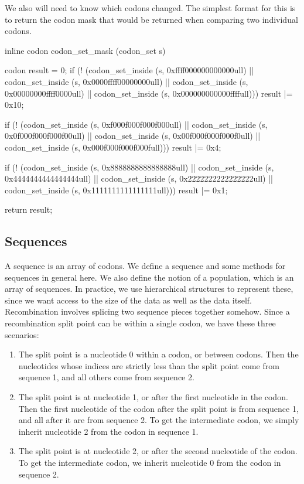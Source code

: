 \documentclass{article}
\begin{document}
      We also will need to know which codons changed. The simplest format for
      this is to return the codon mask that would be returned when comparing two
      individual codons.

\begin{ccode}
inline codon codon_set_mask (codon_set s) {
  codon result = 0;
  if (! (codon_set_inside (s, 0xffff000000000000ull) ||
         codon_set_inside (s, 0x0000ffff00000000ull) ||
         codon_set_inside (s, 0x00000000ffff0000ull) ||
         codon_set_inside (s, 0x000000000000ffffull)))
    result |= 0x10;

  if (! (codon_set_inside (s, 0xf000f000f000f000ull) ||
         codon_set_inside (s, 0x0f000f000f000f00ull) ||
         codon_set_inside (s, 0x00f000f000f000f0ull) ||
         codon_set_inside (s, 0x000f000f000f000full)))
    result |= 0x4;

  if (! (codon_set_inside (s, 0x8888888888888888ull) ||
         codon_set_inside (s, 0x4444444444444444ull) ||
         codon_set_inside (s, 0x2222222222222222ull) ||
         codon_set_inside (s, 0x1111111111111111ull)))
    result |= 0x1;

  return result;
}
\end{ccode}

    \subsection{Sequences}
      \label{sec:sequences}
      
      A sequence is an array of codons. We define a sequence and some methods
      for sequences in general here. We also define the notion of a population,
      which is an array of sequences. In practice, we use hierarchical
      structures to represent these, since we want access to the size of the
      data as well as the data itself. Recombination involves splicing two
      sequence pieces together somehow. Since a recombination split point can be
      within a single codon, we have these three scenarios:

      \begin{enumerate}
	\item The split point is a nucleotide 0 within a codon, or between
	codons. Then the nucleotides whose indices are strictly less than the
	split point come from sequence 1, and all others come from sequence 2.

	\item The split point is at nucleotide 1, or after the first nucleotide
	in the codon. Then the first nucleotide of the codon after the split
	point is from sequence 1, and all after it are from sequence 2. To get
	the intermediate codon, we simply inherit nucleotide 2 from the codon in
	sequence 1.

	\item The split point is at nucleotide 2, or after the second nucleotide
	of the codon. To get the intermediate codon, we inherit nucleotide 0
	from the codon in sequence 2.
      \end{enumerate}
\end{document}
